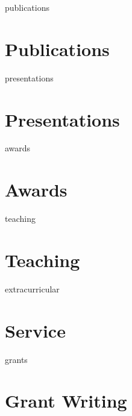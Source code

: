 \documentclass[12pt]{report} %
\begin{document}
\ifcsname publications\endcsname%
\section{Publications}
\publications{}
\fi



\ifcsname presentations\endcsname%
\section{Presentations}
\presentations{}
\fi



\ifcsname awards\endcsname%
\section{Awards}
\awards{}
\fi



\ifcsname teaching\endcsname%
\section{Teaching}
\teaching{}
\fi



\ifcsname extracurricular\endcsname%
\section{Service}
\extracurricular{}
\fi



\ifcsname grants\endcsname%
\section{Grant Writing}
\grants{}
\fi
\end{document}
